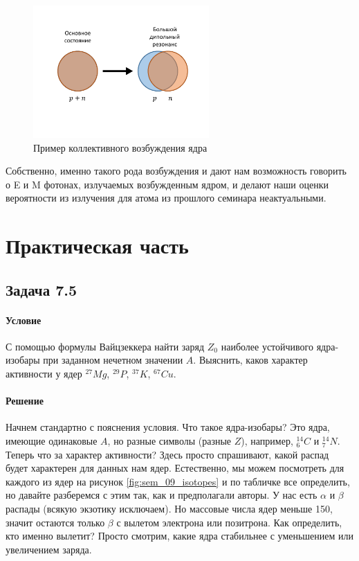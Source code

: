 \documentclass[12pt]{article}
\begin{document}
\begin{figure}[H]
    \centering
    \includegraphics[width=0.6\textwidth,keepaspectratio]{Seminar_09/pics/pic_dipole_resonance.pdf}
    \caption{Пример коллективного возбуждения ядра}
    \label{fig:sem_09_dipole_res}
\end{figure}
Собственно, именно такого рода возбуждения и дают нам возможность говорить о E и M фотонах, излучаемых  возбужденным ядром, и делают наши оценки вероятности из излучения для атома из прошлого семинара неактуальными.

\section{Практическая часть}
\subsection{Задача 7.5}
\label{task_1}
\paragraph{Условие}
С помощью формулы Вайцзеккера найти заряд $Z_0$ наиболее устойчивого ядра-изобары при заданном нечетном значении $A$. Выяснить, каков характер активности у ядер ${}^{27}Mg$, ${}^{29}P$, ${}^{37}K$, ${}^{67}Cu$.
\paragraph{Решение}
Начнем стандартно с пояснения условия. Что такое ядра-изобары? Это ядра, имеющие одинаковые $A$, но разные символы (разные $Z$), например, ${}^{14}_6C$ и ${}^{14}_7N$. Теперь что за характер активности? Здесь просто спрашивают, какой распад будет характерен для данных нам ядер. Естественно, мы можем посмотреть для каждого из ядер на рисунок \ref{fig:sem_09_isotopes} и по табличке все определить, но давайте разберемся с этим так, как и предполагали авторы. У нас есть $\alpha$ и $\beta$ распады (всякую экзотику исключаем). Но массовые числа ядер меньше 150, значит остаются только $\beta$ с вылетом электрона или позитрона. Как определить, кто именно вылетит? Просто смотрим, какие ядра стабильнее с уменьшением или увеличением заряда. 
\end{document}
